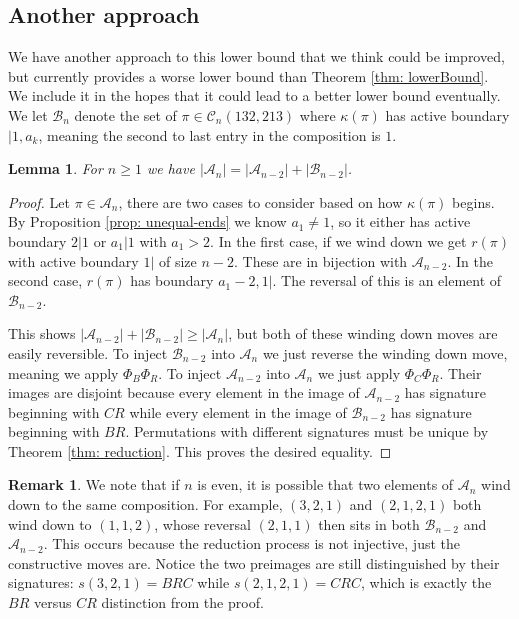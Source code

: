 \documentclass[11pt]{article}
\newcommand\A{\mathcal A}
\newcommand\cB{\mathcal B}
\newcommand\C{\mathcal C}
\newtheorem{lemma}[theorem]{Lemma}
\theoremstyle{definition}
\newtheorem{remark}[theorem]{Remark}
\begin{document}
\subsection{Another approach}

We have another approach to this lower bound that we think could be improved, but currently provides a worse lower bound than Theorem \ref{thm: lowerBound}. We include it in the hopes that it could lead to a better lower bound eventually. We let $\cB_n$ denote the set of $\pi \in \C_n(132,213)$ where $\kappa(\pi)$ has active boundary $|1,a_k$, meaning the second to last entry in the composition is $1$.

\begin{lemma} \label{lem: AtoAB}
    For $n \geq 1$ we have $|\A_n| = |\A_{n-2}| + |\cB_{n-2}|$.
\end{lemma}

\begin{proof}
    Let $\pi \in \A_n$, there are two cases to consider based on how $\kappa(\pi)$ begins. By Proposition \ref{prop: unequal-ends} we know $a_1 \not= 1$, so it either has active boundary $2|1$ or $a_1|1$ with $a_1 > 2$. In the first case, if we wind down we get $r(\pi)$ with active boundary $1|$ of size $n-2$. These are in bijection with $\A_{n-2}$. In the second case, $r(\pi)$ has boundary $a_1-2,1|$. The reversal of this is an element of $\cB_{n-2}$.

    This shows $|\A_{n-2}| + |\cB_{n-2}| \geq |\A_n|$, but both of these winding down moves are easily reversible. To inject $\cB_{n-2}$ into $\A_n$ we just reverse the winding down move, meaning we apply $\Phi_B\Phi_R$. To inject $\A_{n-2}$ into $\A_n$ we just apply $\Phi_C\Phi_R$. Their images are disjoint because every element in the image of $\A_{n-2}$ has signature beginning with $CR$ while every element in the image of $\cB_{n-2}$ has signature beginning with $BR$. Permutations with different signatures must be unique by Theorem \ref{thm: reduction}. This proves the desired equality.
\end{proof}

\begin{remark}
    We note that if $n$ is even, it is possible that two elements of $\A_n$ wind down to the same composition. For example, $(3,2,1)$ and $(2,1,2,1)$ both wind down to $(1,1,2)$, whose reversal $(2,1,1)$ then sits in both $\cB_{n-2}$ and $\A_{n-2}$. This occurs because the reduction process is not injective, just the constructive moves are. Notice the two preimages are still distinguished by their signatures: $s(3,2,1) = BRC$ while $s(2,1,2,1) = CRC$, which is exactly the $BR$ versus $CR$ distinction from the proof.
\end{remark}
\end{document}
